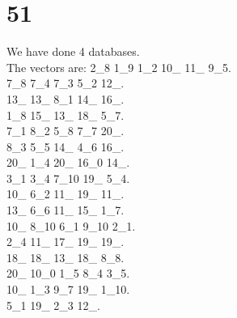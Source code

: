 \chapter{51}
\indent We have done 4 databases.\\
The vectors are:
2\_8 1\_9 1\_2 10\_ 11\_ 9\_5.\\7\_8 7\_4 7\_3 5\_2 12\_.\\13\_ 13\_ 8\_1 14\_ 16\_.\\1\_8 15\_ 13\_ 18\_ 5\_7.\\7\_1 8\_2 5\_8 7\_7 20\_.\\8\_3 5\_5 14\_ 4\_6 16\_.\\20\_ 1\_4 20\_ 16\_0 14\_.\\3\_1 3\_4 7\_10 19\_ 5\_4.\\10\_ 6\_2 11\_ 19\_ 11\_.\\13\_ 6\_6 11\_ 15\_ 1\_7.\\10\_ 8\_10 6\_1 9\_10 2\_1.\\2\_4 11\_ 17\_ 19\_ 19\_.\\18\_ 18\_ 13\_ 18\_ 8\_8.\\20\_ 10\_0 1\_5 8\_4 3\_5.\\10\_ 1\_3 9\_7 19\_ 1\_10.\\5\_1 19\_ 2\_3 12\_.\\